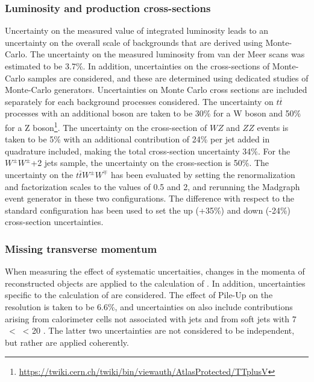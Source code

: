 \subsubsection{Luminosity and production cross-sections}
Uncertainty on the measured value of integrated luminosity leads to an uncertainty on the overall scale of backgrounds that are derived using Monte-Carlo.
The uncertainty on the measured luminosity from van der Meer scans was estimated to be 3.7\%. %
In addition, uncertainties on the cross-sections of Monte-Carlo samples are considered, 
and these are determined using dedicated studies of Monte-Carlo generators.
Uncertainties on Monte Carlo cross sections are included separately for each background processes considered.
The uncertainty on $t \overline{t}$ processes with an additional boson are taken to be 30\% for a W boson and 50\% for a Z boson\footnote{\url{https://twiki.cern.ch/twiki/bin/viewauth/AtlasProtected/TTplusV}}.
The uncertainty on the cross-section of $WZ$ and $ZZ$ events is taken to be 5\% with an additional contribution of 24\% per jet added in quadrature included, making the total cross-section uncertainty 34\%.
For the $W^{\pm}W^{\pm}$+2 jets sample, the uncertainty on the
cross-section is 50\%.  The uncertainty on the
$t\bar{t}W^{\pm}W^{\mp}$ has been evaluated by setting the renormalization
and factorization scales to the values of 0.5 and 2, and rerunning the
Madgraph event generator in these two configurations. The difference
with respect to the standard configuration has been used to set the up
(+35\%) and down (-24\%) cross-section uncertainties.


\subsubsection{Missing transverse momentum}
When measuring the effect of systematic uncertaities, changes in the momenta of reconstructed objects are applied to the calculation of \met{}.
In addition, uncertainties specific to the calculation of \met{} are considered.  
The effect of Pile-Up on the \met{} resolution is taken to be 6.6\%, 
and uncertainties on \met{} also include contributions arising from calorimeter cells not associated with jets and from soft jets with 7 \GeV\ < \pt\ < 20 \GeV{}.
The latter two uncertainties are not considered to be independent, but rather are applied coherently.

